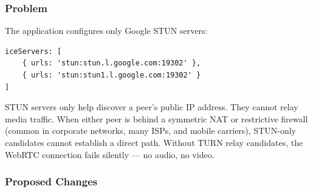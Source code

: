 \documentclass[11pt,letterpaper]{article}
\begin{document}
\subsubsection{Problem}

The application configures only Google STUN servers:

\begin{verbatim}
iceServers: [
    { urls: 'stun:stun.l.google.com:19302' },
    { urls: 'stun:stun1.l.google.com:19302' }
]
\end{verbatim}

STUN servers only help discover a peer's public IP address. They cannot relay media traffic. When either peer is behind a symmetric NAT or restrictive firewall (common in corporate networks, many ISPs, and mobile carriers), STUN-only candidates cannot establish a direct path. Without TURN relay candidates, the WebRTC connection fails silently --- no audio, no video.

\subsubsection{Proposed Changes}
\end{document}
